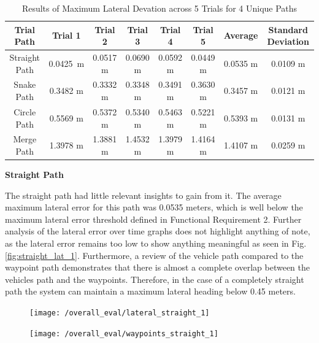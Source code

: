 \documentclass[titlepage,draft]{article}
\begin{document}
{\begin{table}[H]
	\centering
	\begin{tabular}{c c c c c c c c }
		\textbf{Trial Path} & \textbf{Trial 1} & \textbf{Trial 2} & \textbf{Trial 3} & \textbf{Trial 4} & \textbf{Trial 5} & \textbf{Average} & \textbf{Standard Deviation} \\ [0.5ex]
		\hline
		Straight Path       & 0.0425 m         & 0.0517 m         & 0.0690 m         & 0.0592 m         & 0.0449 m         & 0.0535 m         & 0.0109 m                    \\
		\hline
		Snake Path          & 0.3482 m         & 0.3332 m         & 0.3348 m         & 0.3491 m         & 0.3630 m         & 0.3457 m         & 0.0121 m                    \\
		\hline
		Circle Path         & 0.5569 m         & 0.5372 m         & 0.5340 m         & 0.5463 m         & 0.5221 m         & 0.5393 m         & 0.0131 m                    \\
		\hline
		Merge Path          & 1.3978 m         & 1.3881 m         & 1.4532 m         & 1.3979 m         & 1.4164 m         & 1.4107 m         & 0.0259 m                    \\
		\hline
	\end{tabular}
	\caption{Results of Maximum Lateral Devation across 5 Trials for 4 Unique Paths}
	\label{tab:overal_eval}
\end{table}

\textbf{Straight Path}

The straight path had little relevant insights to gain from it. The average maximum lateral error for this path was 0.0535 meters, which is well below the maximum lateral error threshold defined in Functional Requirement 2. Further analysis of the lateral error over time graphs does not highlight anything of note, as the lateral error remains too low to show anything meaningful as seen in Fig. \ref{fig:straight_lat_1}. Furthermore, a review of the vehicle path compared to the waypoint path demonstrates that there is almost a complete overlap between the vehicles path and the waypoints. Therefore, in the case of a completely straight path the system can maintain a maximum lateral heading below 0.45 meters.

\begin{figure}
	\centering
	\begin{minipage}{.45\textwidth}
		\centering
		\texttt{[image: /overall\_eval/lateral\_straight\_1]}
		\label{fig:straight_lat_1}
	\end{minipage}%
	\hspace{0.1\textwidth}%
	\begin{minipage}{.45\textwidth}
		\centering
		\texttt{[image: /overall\_eval/waypoints\_straight\_1]}
		\label{fig:straight_way_1}
	\end{minipage}
\end{figure}

}
\end{document}
